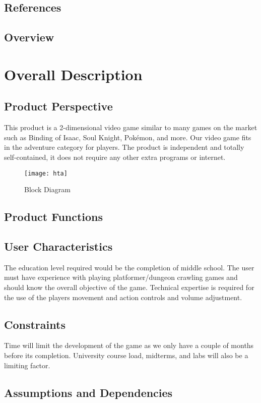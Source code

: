 \documentclass[12pt, titlepage]{article}
\begin{document}
  \subsection{References}
  \subsection{Overview}

\section{Overall Description}

  \subsection{Product Perspective}
  This product is a 2-dimensional video game similar to many games on the market such as Binding of Isaac, Soul Knight, Pokémon, and more. Our video game fits in the adventure category for players. The product is independent and totally self-contained, it does not require any other extra programs or internet.
  
   \begin{figure}[htp]
	\centering
	\texttt{[image: hta]}
	\caption{Block Diagram}
	\label{fig:block}
   \end{figure}

  
  \subsection{Product Functions}
  \subsection{User Characteristics}
  The education level required would be the completion of middle school. The user must have experience with playing platformer/dungeon crawling games and should know the overall objective of the game. Technical expertise is required for the use of the players movement and action controls and volume adjustment.
  \subsection{Constraints}
  Time will limit the development of the game as we only have a couple of months before its completion. University course load, midterms, and labs will also be a limiting factor.
  \subsection{Assumptions and Dependencies}
\end{document}
